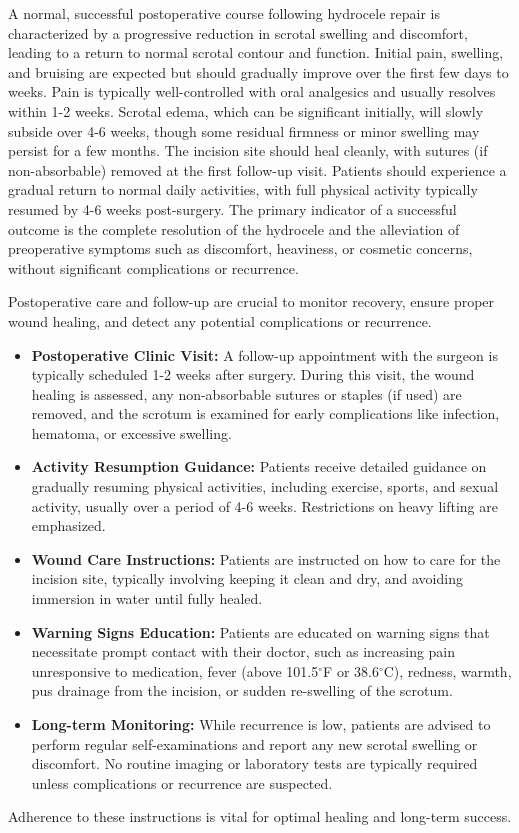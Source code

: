 A normal, successful postoperative course following hydrocele repair is characterized by a progressive reduction in scrotal swelling and discomfort, leading to a return to normal scrotal contour and function. Initial pain, swelling, and bruising are expected but should gradually improve over the first few days to weeks. Pain is typically well-controlled with oral analgesics and usually resolves within 1-2 weeks. Scrotal edema, which can be significant initially, will slowly subside over 4-6 weeks, though some residual firmness or minor swelling may persist for a few months. The incision site should heal cleanly, with sutures (if non-absorbable) removed at the first follow-up visit. Patients should experience a gradual return to normal daily activities, with full physical activity typically resumed by 4-6 weeks post-surgery. The primary indicator of a successful outcome is the complete resolution of the hydrocele and the alleviation of preoperative symptoms such as discomfort, heaviness, or cosmetic concerns, without significant complications or recurrence.

Postoperative care and follow-up are crucial to monitor recovery, ensure proper wound healing, and detect any potential complications or recurrence.

\begin{itemize}
  \item \textbf{Postoperative Clinic Visit:} A follow-up appointment with the surgeon is typically scheduled 1-2 weeks after surgery. During this visit, the wound healing is assessed, any non-absorbable sutures or staples (if used) are removed, and the scrotum is examined for early complications like infection, hematoma, or excessive swelling.
  \item \textbf{Activity Resumption Guidance:} Patients receive detailed guidance on gradually resuming physical activities, including exercise, sports, and sexual activity, usually over a period of 4-6 weeks. Restrictions on heavy lifting are emphasized.
  \item \textbf{Wound Care Instructions:} Patients are instructed on how to care for the incision site, typically involving keeping it clean and dry, and avoiding immersion in water until fully healed.
  \item \textbf{Warning Signs Education:} Patients are educated on warning signs that necessitate prompt contact with their doctor, such as increasing pain unresponsive to medication, fever (above 101.5$^{\circ}$F or 38.6$^{\circ}$C), redness, warmth, pus drainage from the incision, or sudden re-swelling of the scrotum.
  \item \textbf{Long-term Monitoring:} While recurrence is low, patients are advised to perform regular self-examinations and report any new scrotal swelling or discomfort. No routine imaging or laboratory tests are typically required unless complications or recurrence are suspected.
\end{itemize}
Adherence to these instructions is vital for optimal healing and long-term success.

